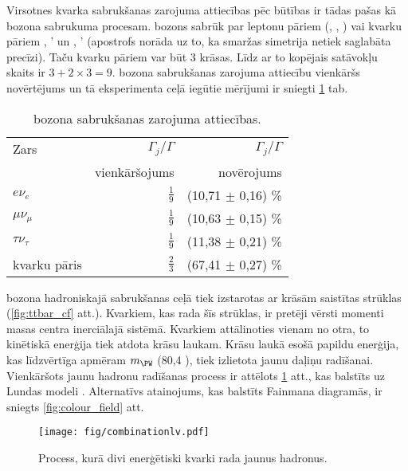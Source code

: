 Virsotnes kvarka sabrukšanas zarojuma attiecības pēc būtības ir tādas pašas kā \PW bozona sabrukuma procesam. \PW bozons sabrūk par leptonu pāriem (\Pe\Pgne, \Pgm\Pgngm, \Pgt\Pgngt) vai kvarku pāriem \cPqu, \cPqd' un \cPqc, \cPqs' (apostrofs norāda uz to, ka smaržas simetrija netiek saglabāta precīzi). Taču kvarku pāriem var būt 3 krāsas. Līdz ar to kopējais satāvokļu skaits ir $3+2\times3=9$. \PW bozona sabrukšanas zarojuma attiecību vienkāršs novērtējums un tā eksperimenta ceļā iegūtie mērījumi ir sniegti \ref{tab:W_br} tab.

\begin{table}[h!]
  \centering
  \caption{\PW bozona sabrukšanas zarojuma attiecības.}
  \label{tab:W_br}
  \begin{tabular}{l r r}
    Zars                  & $\Gamma_{j}/\Gamma$ & $\Gamma_{j}/\Gamma$\\
                          & vienkāršojums       & novērojums \cite{Patrignani:2016xqp}\\
    \hline
    $e\nu_{e}$            & $\frac{1}{9}$       & (10,71 $\pm$ 0,16) \%\\
    $\mu\nu_{\mu}$        & $\frac{1}{9}$       & (10,63 $\pm$ 0,15) \%\\
    $\tau\nu_{\tau}$      & $\frac{1}{9}$       & (11,38 $\pm$ 0,21) \%\\
    kvarku pāris          & $\frac{2}{3}$       & (67,41 $\pm$ 0,27) \%
  \end{tabular}
\end{table}

\PW bozona hadroniskajā sabrukšanas ceļā tiek izstarotas ar krāsām saistītas strūklas (\ref{fig:ttbar_cf} att.). Kvarkiem, kas rada šīs strūklas, ir pretēji vērsti momenti masas centra inerciālajā sistēmā. Kvarkiem attālinoties vienam no otra, to kinētiskā enerģija tiek atdota krāsu laukam. Krāsu laukā esošā papildu enerģija, kas līdzvērtīga apmēram $m_{\PW}$ (80,4 \GeV), tiek izlietota jaunu daļiņu radīšanai. Vienkāršots jaunu hadronu radīšanas process ir attēlots \ref{fig:combination} att., kas balstīts uz Lundas modeli \cite{Andersson:1983ia}. Alternatīvs atainojums, kas balstīts Fainmana diagramās, ir sniegts \ref{fig:colour_field} att.

\begin{figure}[htp]
  \centering
  \texttt{[image: fig/combinationlv.pdf]}
  \caption{Process, kurā divi enerģētiski kvarki rada jaunus hadronus.}
  \label{fig:combination}
\end{figure}

